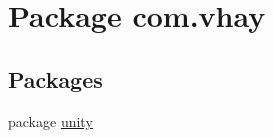 \hypertarget{namespacecom_1_1vhay}{}\section{Package com.\+vhay}
\label{namespacecom_1_1vhay}
\subsection*{Packages}
\begin{DoxyCompactItemize}
\item 
package \mbox{\hyperlink{namespacecom_1_1vhay_1_1unity}{unity}}
\end{DoxyCompactItemize}
